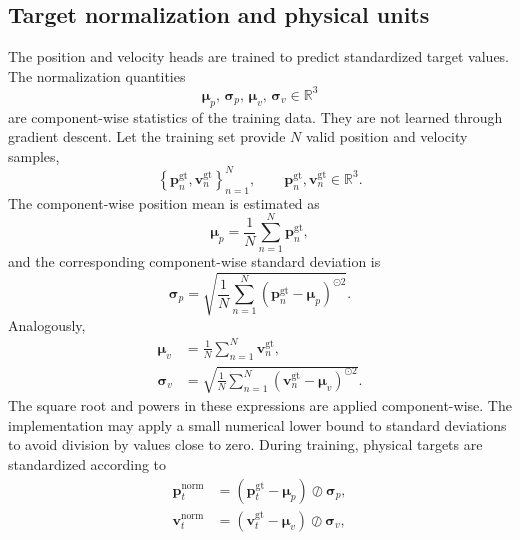\documentclass[11pt,a4paper]{article}
\begin{document}
\subsection{Target normalization and physical units} \label{sec:target-normalization} 
The position and velocity heads are trained to predict standardized target values. The normalization quantities 
\begin{equation} 
	\boldsymbol{\mu}_p,\, \boldsymbol{\sigma}_p,\, \boldsymbol{\mu}_v,\, \boldsymbol{\sigma}_v \in \mathbb{R}^{3} 
\end{equation} 
are component-wise statistics of the training data. They are not learned through gradient descent. Let the training set provide $N$ valid position and velocity samples, \[ \left\{ \mathbf p_n^{\mathrm{gt}}, \mathbf v_n^{\mathrm{gt}} \right\}_{n=1}^{N}, \qquad \mathbf p_n^{\mathrm{gt}}, \mathbf v_n^{\mathrm{gt}} \in \mathbb{R}^{3}. \] The component-wise position mean is estimated as 
\begin{equation} 
	\boldsymbol{\mu}_p = \frac{1}{N} \sum_{n=1}^{N} \mathbf p_n^{\mathrm{gt}}, \label{eq:position-mean} 
\end{equation} 
and the corresponding component-wise standard deviation is 
\begin{equation} 
	\boldsymbol{\sigma}_p = \sqrt{ \frac{1}{N} \sum_{n=1}^{N} \left( \mathbf p_n^{\mathrm{gt}} - \boldsymbol{\mu}_p \right)^{\odot2} }. \label{eq:position-std} 
\end{equation} Analogously, 
\begin{align} 
	\boldsymbol{\mu}_v &= \frac{1}{N} \sum_{n=1}^{N} \mathbf v_n^{\mathrm{gt}}, \\ 
	\boldsymbol{\sigma}_v &= \sqrt{ \frac{1}{N} \sum_{n=1}^{N} \left( \mathbf v_n^{\mathrm{gt}} - \boldsymbol{\mu}_v \right)^{\odot2} }. \label{eq:velocity-statistics} 
\end{align} 
The square root and powers in these expressions are applied component-wise. The implementation may apply a small numerical lower bound to standard deviations to avoid division by values close to zero. During training, physical targets are standardized according to 
\begin{align} 
	\mathbf p_t^{\mathrm{norm}} &= \left( \mathbf p_t^{\mathrm{gt}} - \boldsymbol{\mu}_p \right) \oslash \boldsymbol{\sigma}_p, \\ 
	\mathbf v_t^{\mathrm{norm}} &= \left( \mathbf v_t^{\mathrm{gt}} - \boldsymbol{\mu}_v \right) \oslash \boldsymbol{\sigma}_v, \label{eq:target-standardization} 
\end{align} 
\end{document}
